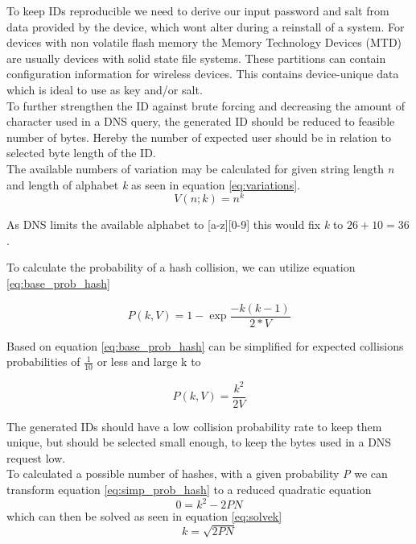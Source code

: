         To keep IDs reproducible we need to derive our input password and salt from data provided by the device, which wont alter during a reinstall of a system. For devices with non volatile flash memory the Memory Technology Devices (MTD) are usually devices with solid state file systems\cite{giometti_mtd_2017}\cite{woodhouse_memory_nodate}. These partitions can contain configuration information for wireless devices. This contains device-unique data which is ideal to use as key and/or salt.\\
        
        To further strengthen the ID against brute forcing and decreasing the amount of character used in a DNS query, the generated ID should be reduced to feasible number of bytes. Hereby the number of expected user should be in relation to selected byte length of the ID.\\
        The available numbers of variation may be calculated for given string length \textit{n} and length of alphabet \textit{k} as seen in equation \ref{eq:variations}.
        \begin{equation}
            \label{eq:variations}
            V(n;k) = n^{k}
        \end{equation}

        As DNS limits the available alphabet to [a-z][0-9] this would fix \textit{k} to $26 + 10 = 36$.
        
        To calculate the probability of a hash collision, we can utilize equation \ref{eq:base_prob_hash}
        
        \begin{equation}
             \label{eq:base_prob_hash}
             P(k,V) = 1 - \exp{\frac{-k(k-1)}{2 * V}}
        \end{equation}
     
        Based on \cite{preshing_hash_2011} equation \ref{eq:base_prob_hash} can be simplified for expected collisions probabilities of $\frac{1}{10}$ or less and large k to
     
        \begin{equation}
            \label{eq:simp_prob_hash}
            P(k,V) = \frac{k^2}{2V} 
        \end{equation}
        
        The generated IDs should have a low collision probability rate to keep them unique, but should be selected small enough, to keep the bytes used in a DNS request low. \\
        To calculated a possible number of hashes, with a given probability \textit{P} we can transform equation \ref{eq:simp_prob_hash} to a reduced quadratic equation
        \begin{equation*}
            0 = k^2 - 2PN
        \end{equation*}
        which can then be solved as seen in equation \ref{eq:solvek}
        \begin{equation}
            \label{eq:solvek}
            k = \sqrt{2PN}
        \end{equation}
        
